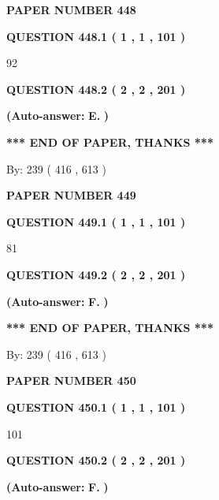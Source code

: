 \documentclass{ctexart}
\begin{document}
   
 {\textbf{ \Large{ PAPER NUMBER  448  }}}
   
   
   
   
  
  
{\textbf{\large{QUESTION
448.1 
 ( 1 , 1 , 101 )
}}}

92
  
  
{\textbf{\large{QUESTION
448.2 
 ( 2 , 2 , 201 )
}}}
 
 
{\textbf{(Auto-answer:}}
{\textbf{\large{
E.}}}
{\textbf{)}}
 
 
   
   
   
   
\vspace{1.0in} 
{\textbf{\large{ *** END OF PAPER, THANKS *** }}} 
   
   
\hspace{1.0in} By: 
 239 ( 416 ,  613 )
   
   
   
   
\newpage 
\setcounter{page}{ 
   449001 } 
   
   
 {\textbf{ \Large{ PAPER NUMBER  449  }}}
   
   
   
   
  
  
{\textbf{\large{QUESTION
449.1 
 ( 1 , 1 , 101 )
}}}

81
  
  
{\textbf{\large{QUESTION
449.2 
 ( 2 , 2 , 201 )
}}}
 
 
{\textbf{(Auto-answer:}}
{\textbf{\large{
F.}}}
{\textbf{)}}
 
 
   
   
   
   
\vspace{1.0in} 
{\textbf{\large{ *** END OF PAPER, THANKS *** }}} 
   
   
\hspace{1.0in} By: 
 239 ( 416 ,  613 )
   
   
   
   
\newpage 
\setcounter{page}{ 
   450001 } 
   
   
 {\textbf{ \Large{ PAPER NUMBER  450  }}}
   
   
   
   
  
  
{\textbf{\large{QUESTION
450.1 
 ( 1 , 1 , 101 )
}}}

101
  
  
{\textbf{\large{QUESTION
450.2 
 ( 2 , 2 , 201 )
}}}
 
 
{\textbf{(Auto-answer:}}
{\textbf{\large{
F.}}}
{\textbf{)}}
 
\end{document}
